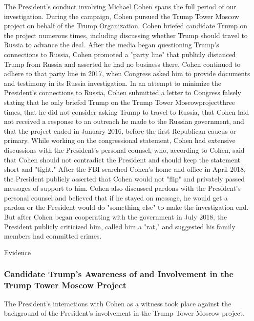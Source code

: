 The President's conduct involving Michael Cohen spans the full period of our investigation.
During the campaign, Cohen pursued the Trump Tower Moscow project on behalf of the Trump Organization.
Cohen briefed candidate Trump on the project numerous times, including discussing whether Trump should travel to Russia to advance the deal.
After the media began questioning Trump's connections to Russia, Cohen promoted a "party line" that publicly distanced Trump from Russia and asserted he had no business there.
Cohen continued to adhere to that party line in 2017, when Congress asked him to provide documents and testimony in its Russia investigation.
In an attempt to minimize the President's connections to Russia, Cohen submitted a letter to Congress falsely stating that he only briefed Trump on the Trump Tower Moscowprojectthree times, that he did not consider asking Trump to travel to Russia, that Cohen had not received a response to an outreach he made to the Russian government, and that the project ended in January 2016, before the first Republican caucus or primary.
While working on the congressional statement, Cohen had extensive discussions with the President's personal counsel, who, according to Cohen, said that Cohen should not contradict the President and should keep the statement short and "tight."
After the FBI searched Cohen's home and office in April 2018, the President publicly asserted that Cohen would not "flip" and privately passed messages of support to him.
Cohen also discussed pardons with the President's personal counsel and believed that if he stayed on message, he would get a pardon or the President would do "something else" to make the investigation end.
But after Cohen began cooperating with the government in July 2018, the President publicly criticized him, called him a "rat," and suggested his family members had committed crimes.

Evidence

\subsubsection{Candidate Trump's Awareness of and Involvement in the Trump Tower Moscow Project}

The President's interactions with Cohen as a witness took place against the background of the President's involvement in the Trump Tower Moscow project.

